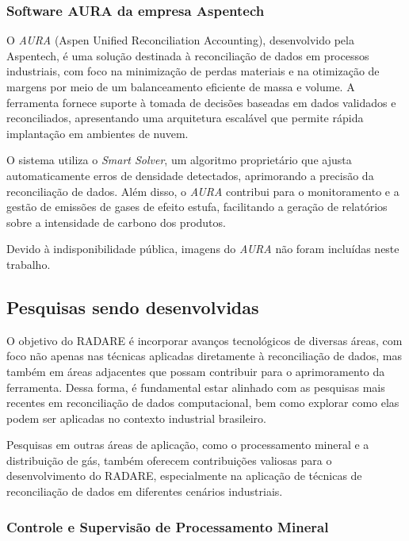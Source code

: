 \subsubsection{Software AURA da empresa Aspentech}

O \textit{AURA} (Aspen Unified Reconciliation Accounting), desenvolvido pela Aspentech, é uma solução destinada à reconciliação de dados em processos industriais, com foco na minimização de perdas materiais e na otimização de margens por meio de um balanceamento eficiente de massa e volume. A ferramenta fornece suporte à tomada de decisões baseadas em dados validados e reconciliados, apresentando uma arquitetura escalável que permite rápida implantação em ambientes de nuvem.

O sistema utiliza o \textit{Smart Solver}, um algoritmo proprietário que ajusta automaticamente erros de densidade detectados, aprimorando a precisão da reconciliação de dados. Além disso, o \textit{AURA} contribui para o monitoramento e a gestão de emissões de gases de efeito estufa, facilitando a geração de relatórios sobre a intensidade de carbono dos produtos.

Devido à indisponibilidade pública, imagens do \textit{AURA} não foram incluídas neste trabalho.

\subsection{Pesquisas sendo desenvolvidas}

O objetivo do RADARE é incorporar avanços tecnológicos de diversas áreas, com foco não apenas nas técnicas aplicadas diretamente à reconciliação de dados, mas também em áreas adjacentes que possam contribuir para o aprimoramento da ferramenta. Dessa forma, é fundamental estar alinhado com as pesquisas mais recentes em reconciliação de dados computacional, bem como explorar como elas podem ser aplicadas no contexto industrial brasileiro.

Pesquisas em outras áreas de aplicação, como o processamento mineral e a distribuição de gás, também oferecem contribuições valiosas para o desenvolvimento do RADARE, especialmente na aplicação de técnicas de reconciliação de dados em diferentes cenários industriais.

\subsubsection{Controle e Supervisão de Processamento Mineral}

